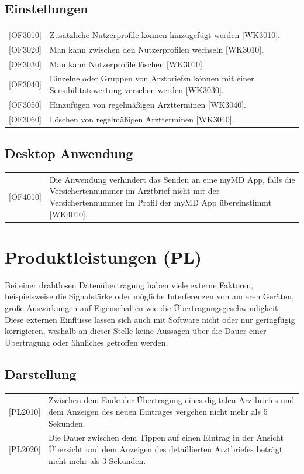 \documentclass[a4paper]{scrreprt}
\begin{document}
\subsection{Einstellungen}
\begin{tabular}{lll}
[OF3010] &  \multicolumn{2}{p{12cm}}{Zusätzliche \gls{Nutzer}profile können hinzugefügt werden [WK3010].}\\
{[OF3020]} &  \multicolumn{2}{p{12cm}}{Man kann zwischen den Nutzerprofilen wechseln [WK3010].}\\
{[OF3030]} &  \multicolumn{2}{p{12cm}}{Man kann Nutzerprofile löschen [WK3010].}\\
{[OF3040]} &  \multicolumn{2}{p{12cm}}{Einzelne oder Gruppen von \glspl{Arztbrief}n können mit einer Sensibilitätswertung versehen werden [WK3030].}  \\
{[OF3050]} &  \multicolumn{2}{p{12cm}}{Hinzufügen von regelmäßigen Arztterminen [WK3040].}  \\
{[OF3060]} &  \multicolumn{2}{p{12cm}}{Löschen von regelmäßigen Arztterminen [WK3040].}  \\
\end{tabular}

\subsection{\gls{Desktop Anwendung}}
\begin{tabular}{lll}
{[OF4010]}&  \multicolumn{2}{p{12cm}}{Die Anwendung verhindert das Senden an eine myMD \gls{App}, falls die \gls{Versichertennummer} im \gls{Arztbrief} nicht mit der \gls{Versichertennummer} im Profil der myMD App übereinstimmt [WK4010].}\\
\end{tabular}
\newpage
\section{Produktleistungen (PL)}
Bei einer drahtlosen Datenübertragung haben viele externe Faktoren, beispielsweise die Signalstärke oder mögliche Interferenzen von anderen Geräten, große Auswirkungen auf Eigenschaften wie die Übertragungsgeschwindigkeit. Diese externen Einflüsse lassen sich auch mit Software nicht oder nur geringfügig korrigieren, weshalb an dieser Stelle keine Aussagen über die Dauer einer Übertragung oder ähnliches getroffen werden.


\subsection{Darstellung}
\begin{tabular}{lll}
[PL2010]&  \multicolumn{2}{p{12cm}}{Zwischen dem Ende der Übertragung eines digitalen Arztbriefes und dem Anzeigen des neuen Eintrages vergehen nicht mehr als 5 Sekunden.}\\
{[PL2020]}&  \multicolumn{2}{p{12cm}}{Die Dauer zwischen dem Tippen auf einen Eintrag in der Ansicht Übersicht und dem Anzeigen des detaillierten Arztbriefes beträgt nicht mehr als 3 Sekunden.}\\

\end{tabular}
\end{document}
